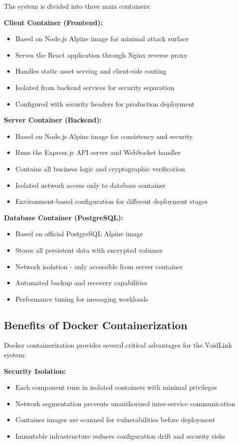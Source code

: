 \documentclass[12pt,a4paper,openany]{book}
\begin{document}
The system is divided into three main containers:

\textbf{Client Container (Frontend):}
\begin{itemize}
\item Based on Node.js Alpine image for minimal attack surface
\item Serves the React application through Nginx reverse proxy
\item Handles static asset serving and client-side routing
\item Isolated from backend services for security separation
\item Configured with security headers for production deployment
\end{itemize}

\textbf{Server Container (Backend):}
\begin{itemize}
\item Based on Node.js Alpine image for consistency and security
\item Runs the Express.js \cite{express} API server and WebSocket handler
\item Contains all business logic and cryptographic verification
\item Isolated network access only to database container
\item Environment-based configuration for different deployment stages
\end{itemize}

\textbf{Database Container (PostgreSQL):}
\begin{itemize}
\item Based on official PostgreSQL Alpine image
\item Stores all persistent data with encrypted volumes
\item Network isolation - only accessible from server container
\item Automated backup and recovery capabilities
\item Performance tuning for messaging workloads
\end{itemize}

\subsection{Benefits of Docker Containerization}

Docker containerization provides several critical advantages for the VoidLink system:

\textbf{Security Isolation:}
\begin{itemize}
\item Each component runs in isolated containers with minimal privileges
\item Network segmentation prevents unauthorized inter-service communication
\item Container images are scanned for vulnerabilities before deployment
\item Immutable infrastructure reduces configuration drift and security risks
\end{itemize}
\end{document}
